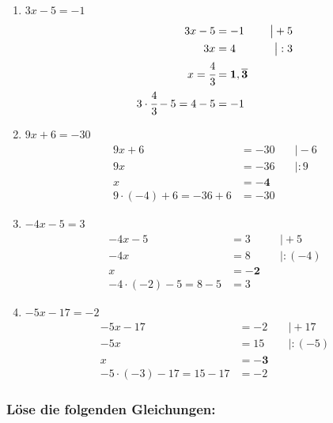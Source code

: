 \documentclass[a4paper,10pt]{article} %
\begin{document}
\begin{enumerate}[label=\alph*)]
  \item \(3x - 5 = -1\)
  \[
    \begin{aligned}
      3x - 5 &= -1 &\quad\big| + 5 \\
      3x &= 4 &\quad\big| : 3 \\
      x = \cfrac{4}{3} &= \mathbf{1,\overline{3}} \\
      3 \cdot \cfrac{4}{3} - 5 = 4 - 5 &= -1
    \end{aligned}
  \]

  \item \(9x + 6 = -30\)
  \[
    \begin{aligned}
      9x + 6 &= -30 &\quad\big| - 6 \\
      9x &= -36 &\quad\big| : 9 \\
      x &= \mathbf{-4} \\
      9 \cdot (-4) + 6 = -36 + 6 &= -30
    \end{aligned}
  \]

  \item \(-4x - 5 = 3\)
  \[
    \begin{aligned}
      -4x - 5 &= 3 &\quad\big| + 5 \\
      -4x &= 8 &\quad\big| : (-4) \\
      x &= \mathbf{-2} \\
      -4 \cdot (-2) - 5 = 8 - 5 &= 3
    \end{aligned}
  \]

  \item \(-5x - 17 = -2\)
  \[
    \begin{aligned}
      -5x - 17 &= -2 &\quad\big| + 17 \\
      -5x &= 15 &\quad\big| : (-5) \\
      x &= \mathbf{-3} \\
      -5 \cdot (-3) - 17 = 15 - 17 &= -2
    \end{aligned}
  \]

\end{enumerate}

\subsubsection{Löse die folgenden Gleichungen:} %
\end{document}
